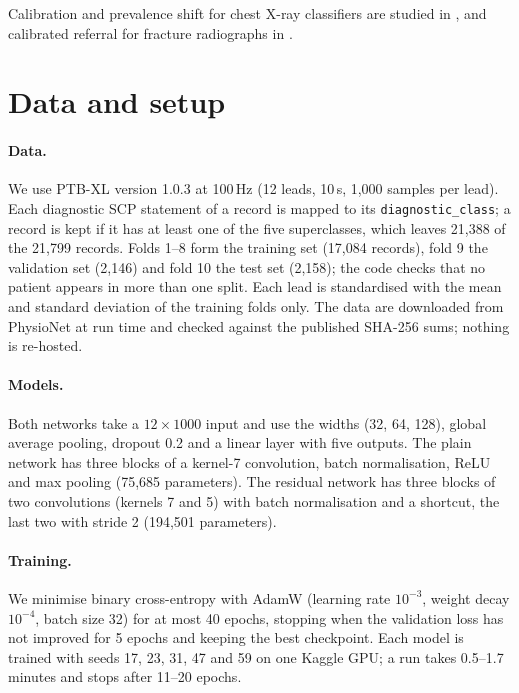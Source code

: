 \documentclass[11pt,a4paper]{article}
\newcommand{\code}[1]{\texttt{#1}}
\begin{document}
Calibration and prevalence shift for chest X-ray classifiers are studied in \citep{hussain2026lung}, and calibrated referral for fracture radiographs in \citep{hussain2026fracatlas}.

\section{Data and setup}

\paragraph{Data.} We use PTB-XL version 1.0.3 at 100\,Hz (12 leads, 10\,s, 1,000 samples per lead). Each diagnostic
SCP statement of a record is mapped to its \code{diagnostic\_class}; a record is kept if it has at least one of the
five superclasses, which leaves 21,388 of the 21,799 records. Folds 1--8 form the training set (17,084 records), fold 9
the validation set (2,146) and fold 10 the test set (2,158); the code checks that no patient appears in more than one
split. Each lead is standardised with the mean and standard deviation of the training folds only. The data are
downloaded from PhysioNet at run time and checked against the published SHA-256 sums; nothing is re-hosted.

\paragraph{Models.} Both networks take a $12 \times 1000$ input and use the widths (32, 64, 128), global average
pooling, dropout 0.2 and a linear layer with five outputs. The plain network has three blocks of a kernel-7
convolution, batch normalisation, ReLU and max pooling (75,685 parameters). The residual network has three blocks of
two convolutions (kernels 7 and 5) with batch normalisation and a shortcut, the last two with stride 2 (194,501
parameters).

\paragraph{Training.} We minimise binary cross-entropy with AdamW \citep{loshchilov2019adamw} (learning rate
$10^{-3}$, weight decay $10^{-4}$, batch size 32) for at most 40 epochs, stopping when the validation loss has not
improved for 5 epochs and keeping the best checkpoint. Each model is trained with seeds 17, 23, 31, 47 and 59 on
one Kaggle GPU; a run takes 0.5--1.7 minutes and stops after 11--20 epochs.
\end{document}

